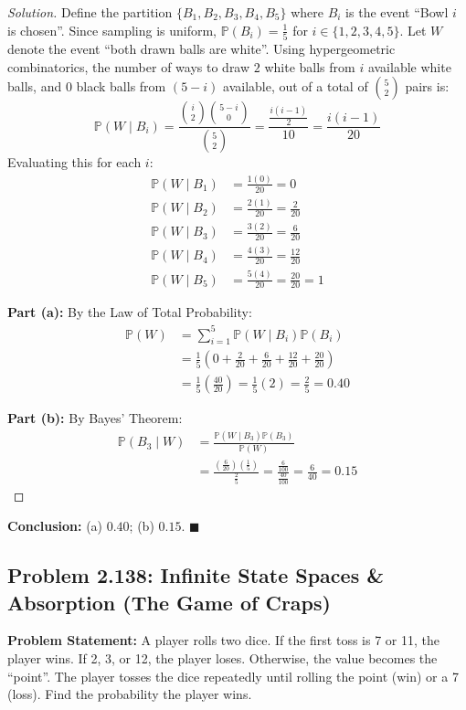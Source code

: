 \documentclass[11pt]{article}
\theoremstyle{definition}
\theoremstyle{plain}
\theoremstyle{remark}
\renewcommand{\P}{\mathbb{P}}
\newcommand{\1}{\mathbf{1}}
\begin{document}
\begin{proof}[Solution]
Define the partition $\{B_1, B_2, B_3, B_4, B_5\}$ where $B_i$ is the event ``Bowl $i$ is chosen''.
Since sampling is uniform, $\P(B_i) = \frac{1}{5}$ for $i \in \{1, 2, 3, 4, 5\}$.
Let $W$ denote the event ``both drawn balls are white''.
Using hypergeometric combinatorics, the number of ways to draw $2$ white balls from $i$ available white balls, and $0$ black balls from $(5-i)$ available, out of a total of $\binom{5}{2}$ pairs is:
\[ \P(W \mid B_i) = \frac{\binom{i}{2}\binom{5-i}{0}}{\binom{5}{2}} = \frac{\frac{i(i-1)}{2}}{10} = \frac{i(i-1)}{20} \]
Evaluating this for each $i$:
\begin{align*}
\P(W \mid B_1) &= \frac{1(0)}{20} = 0 \\
\P(W \mid B_2) &= \frac{2(1)}{20} = \frac{2}{20} \\
\P(W \mid B_3) &= \frac{3(2)}{20} = \frac{6}{20} \\
\P(W \mid B_4) &= \frac{4(3)}{20} = \frac{12}{20} \\
\P(W \mid B_5) &= \frac{5(4)}{20} = \frac{20}{20} = 1
\end{align*}

\textbf{Part (a):} By the Law of Total Probability:
\begin{align*}
\P(W) &= \sum_{i=1}^5 \P(W \mid B_i)\P(B_i) \\
      &= \frac{1}{5} \left( 0 + \frac{2}{20} + \frac{6}{20} + \frac{12}{20} + \frac{20}{20} \right) \\
      &= \frac{1}{5} \left( \frac{40}{20} \right) = \frac{1}{5}(2) = \frac{2}{5} = 0.40
\end{align*}

\textbf{Part (b):} By Bayes' Theorem:
\begin{align*}
\P(B_3 \mid W) &= \frac{\P(W \mid B_3)\P(B_3)}{\P(W)} \\
               &= \frac{\left(\frac{6}{20}\right)\left(\frac{1}{5}\right)}{\frac{2}{5}} = \frac{\frac{6}{100}}{\frac{40}{100}} = \frac{6}{40} = 0.15
\end{align*}
\end{proof}
\textbf{Conclusion:} (a) $0.40$; (b) $0.15$. $\blacksquare$

\subsection{Problem 2.138: Infinite State Spaces \& Absorption (The Game of Craps)}
\textbf{Problem Statement:}
A player rolls two dice. If the first toss is 7 or 11, the player wins. If 2, 3, or 12, the player loses. Otherwise, the value becomes the ``point''. The player tosses the dice repeatedly until rolling the point (win) or a 7 (loss). Find the probability the player wins.
\end{document}
